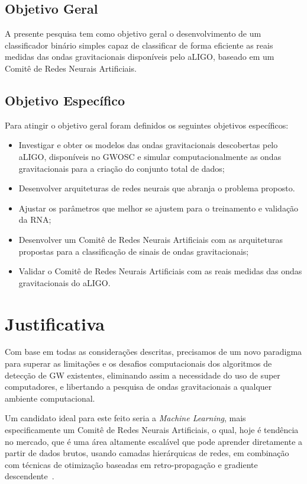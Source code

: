 \subsection{Objetivo Geral}
\label{sec:objetivo-geral}

A presente pesquisa tem como objetivo geral o desenvolvimento de um classificador binário simples capaz de classificar de forma eficiente as reais medidas das ondas gravitacionais disponíveis pelo aLIGO, baseado em um Comitê de Redes Neurais Artificiais.

\subsection{Objetivo Específico}
\label{sec:objetivo-especifico}

Para atingir o objetivo geral foram definidos os seguintes objetivos específicos: 
\begin{itemize}

\item Investigar e obter os modelos das ondas gravitacionais descobertas pelo aLIGO, disponíveis no GWOSC \cite{vallisneri2015ligo} e simular computacionalmente as ondas gravitacionais para a criação do conjunto total de dados;
\item Desenvolver arquiteturas de redes neurais que abranja o problema proposto.
\item Ajustar os parâmetros que melhor se ajustem para o treinamento e validação da RNA;
\item Desenvolver um Comitê de Redes Neurais Artificiais com as arquiteturas propostas para a classificação de sinais de ondas gravitacionais;
\item Validar o Comitê de Redes Neurais Artificiais com as reais medidas das ondas gravitacionais do aLIGO.

\end{itemize}

\section{Justificativa}
\label{sec:justificativa}


Com base em todas as considerações descritas, precisamos de um novo paradigma para superar as limitações e os desafios computacionais dos algoritmos de detecção de GW existentes, eliminando assim a necessidade do uso de super computadores, e libertando a pesquisa de ondas gravitacionais a qualquer ambiente computacional.

Um candidato ideal para este feito seria a \textit{Machine Learning}, mais especificamente um Comitê de Redes Neurais Artificiais, o qual, hoje é tendência no mercado, que é uma área  altamente escalável que pode aprender diretamente a partir de dados brutos, usando camadas hierárquicas de redes, em combinação com técnicas de otimização baseadas em retro-propagação e gradiente descendente~\cite{barca2005treinamento}. 

